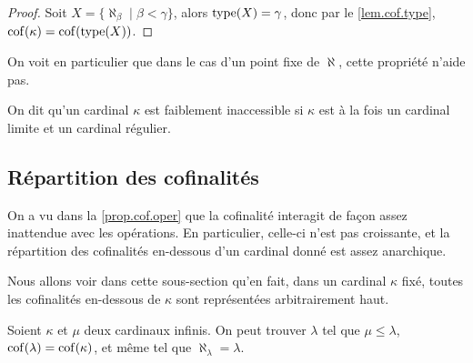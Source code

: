 \begin{proof}
  Soit $X = \{\aleph_\beta \mid \beta < \gamma\}$, alors $\operatorname{type}(X) = \gamma$,
  donc par le \cref{lem.cof.type}, $\operatorname{cof}(\kappa) = \operatorname{cof}(\operatorname{type}(X))$.
\end{proof}

On voit en particulier que dans le cas d'un point fixe de $\aleph$, cette
propriété n'aide pas.

\begin{definition}
  On dit qu'un cardinal $\kappa$ est faiblement inaccessible si $\kappa$ est à
  la fois un cardinal limite et un cardinal régulier.
\end{definition}

\subsection{Répartition des cofinalités}

On a vu dans la \cref{prop.cof.oper} que la cofinalité interagit de façon assez
inattendue avec les opérations. En particulier, celle-ci n'est pas croissante,
et la répartition des cofinalités en-dessous d'un cardinal donné est assez
anarchique.

Nous allons voir dans cette sous-section qu'en fait, dans un cardinal $\kappa$
fixé, toutes les cofinalités en-dessous de $\kappa$ sont représentées
arbitrairement haut.

\begin{proposition}
  Soient $\kappa$ et $\mu$ deux cardinaux infinis. On peut trouver $\lambda$ tel
  que $\mu \leq \lambda$, $\operatorname{cof}(\lambda) = \operatorname{cof}(\kappa)$, et même tel que
  $\aleph_\lambda = \lambda$.
\end{proposition}

